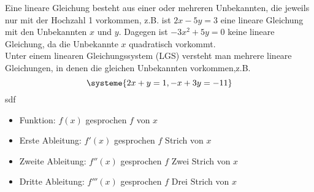 Eine lineare Gleichung besteht aus einer oder mehreren Unbekannten, die jeweils nur mit der Hochzahl 1 vorkommen, z.B. ist \mbox{\(2x-5y=3\)} eine lineare Gleichung mit den Unbekannten \(x\) und \(y\). Dagegen ist \mbox{\(-3x^2+5y=0\)} keine lineare Gleichung, da die Unbekannte \(x\) quadratisch vorkommt.\\
Unter einem linearen Gleichungssystem (LGS) versteht man mehrere lineare Gleichungen, in denen die gleichen Unbekannten vorkommen,z.B.
\[\systeme{2x+y=1,-x+3y=-11}\]
sdf

\begin{itemize}
	\item Funktion: \textcolor{loes}{\(f(x)\) gesprochen \(f\) von \(x\)}\\
	\item Erste Ableitung: \textcolor{loes}{\(f'(x)\) gesprochen \(f\) Strich von \(x\)}\\
	\item Zweite Ableitung: \textcolor{loes}{\(f''(x)\) gesprochen \(f\) Zwei Strich von \(x\)}\\
	\item Dritte Ableitung: \textcolor{loes}{\(f'''(x)\) gesprochen \(f\) Drei Strich von \(x\)}\\
\end{itemize}


